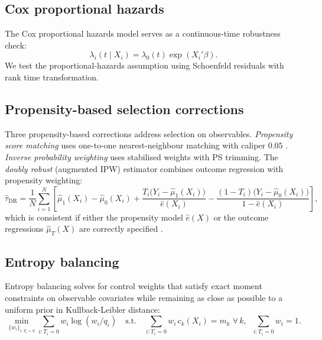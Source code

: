 \documentclass[11pt,a4paper]{article}
\begin{document}
\subsection{Cox proportional hazards}

The Cox proportional hazards model \citep{Cox1972, AndersenGill1982} serves as a continuous-time robustness check:
\begin{equation}
  \lambda_i(t \mid X_i) = \lambda_0(t)\exp(X_i'\beta).
  \label{eq:cox}
\end{equation}
We test the proportional-hazards assumption using Schoenfeld residuals \citep{Schoenfeld1982, GrambschTherneau1994} with rank time transformation.

\subsection{Propensity-based selection corrections}

Three propensity-based corrections address selection on observables. \textit{Propensity score matching} uses one-to-one nearest-neighbour matching with caliper $0.05$ \citep{Caliendo2008}. \textit{Inverse probability weighting} \citep{Robins1994} uses stabilised weights with PS trimming. The \textit{doubly robust} (augmented IPW) estimator combines outcome regression with propensity weighting:
\begin{equation}
  \hat\tau_{\mathrm{DR}} = \frac{1}{N}\sum_{i=1}^N \left[\hat\mu_1(X_i) - \hat\mu_0(X_i) + \frac{T_i\bigl(Y_i - \hat\mu_1(X_i)\bigr)}{\hat e(X_i)} - \frac{(1-T_i)\bigl(Y_i - \hat\mu_0(X_i)\bigr)}{1-\hat e(X_i)}\right],
  \label{eq:dr}
\end{equation}
which is consistent if either the propensity model $\hat e(X)$ or the outcome regressions $\hat\mu_T(X)$ are correctly specified \citep{Bang2005}.

\subsection{Entropy balancing}

Entropy balancing \citep{Hainmueller2012} solves for control weights that satisfy exact moment constraints on observable covariates while remaining as close as possible to a uniform prior in Kullback-Leibler distance:
\begin{equation}
  \min_{\{w_i\}_{i:T_i=0}} \sum_{i:T_i=0} w_i \log(w_i/q_i) \quad \text{s.t.} \quad \sum_{i:T_i=0} w_i \, c_{k}(X_i) = m_k \;\forall\, k, \;\; \sum_{i:T_i=0} w_i = 1.
  \label{eq:eb}
\end{equation}
\end{document}
